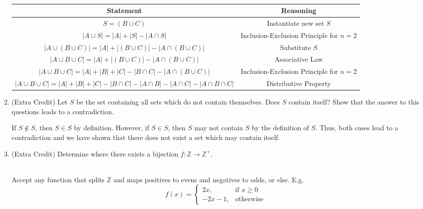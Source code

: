 \begin{enumerate}
\begin{solution}\\
\begin{tabular}{c|c}
    Statement & Reasoning \\
    \hline
    $S = (B \cup C)$ & Instantiate new set $S$ \\
    $|A \cup S| = |A| + |S| - |A \cap S|$ & Inclusion-Exclusion Principle for $n = 2$ \\
    $|A \cup (B \cup C)| = |A| + |(B \cup C)| - |A \cap (B \cup C)|$ & Substitute $S$ \\
    $|A \cup B \cup C| = |A| + |(B \cup C)| - |A \cap (B \cup C)|$ & Associative Law \\
    $|A \cup B \cup C| = |A| + |B| + |C| - |B \cap C| - |A \cap (B \cup C)|$ & Inclusion-Exclusion Principle for $n = 2$ \\
    $|A \cup B \cup C| = |A| + |B| + |C| - |B \cap C| - |A \cap B| - |A \cap C| - |A \cap B \cap C|$ & Distributive Property \\
\end{tabular}
\end{solution}

\item (Extra Credit) Let $S$ be the set containing all sets which do not contain themselves. Does $S$ contain itself? Show that the answer to this questions leads to a contradiction. 

\begin{solution}
If $S \notin S$, then $S \in S$ by definition. However, if $S \in S$, then $S$ may not contain $S$ by the definition of $S$. Thus, both cases lead to a contradiction and we have shown that there does not exist a set which may contain itself.
\end{solution}

\item (Extra Credit) Determine where there exists a bijection $f : \mathbb{Z} \rightarrow \mathbb{Z}^+$. 

\begin{solution}\\
Accept any function that splits $\mathbb{Z}$ and maps positives to evens and negatives to odds, or else. E.g.
\[
    f(x)= 
\begin{cases}
    2x,& \text{if } x\geq 0\\
    -2x-1,              & \text{otherwise}
\end{cases}
\]
\end{solution}

\end{enumerate}